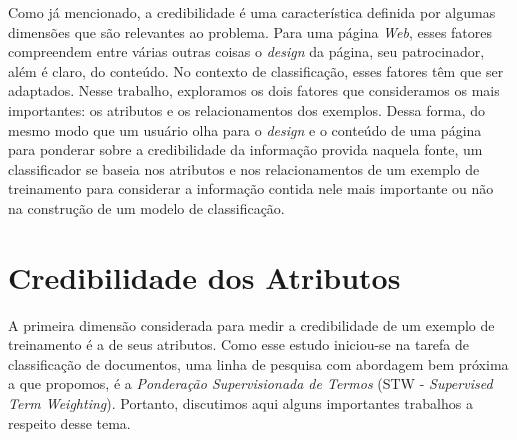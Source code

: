 Como já mencionado, a credibilidade é uma característica definida por algumas dimensões que são relevantes ao problema. Para uma página \textit{Web}, esses fatores compreendem entre várias outras coisas o \textit{design} da página, seu patrocinador, além é claro, do conteúdo. No contexto de classificação, esses fatores têm que ser adaptados. Nesse trabalho, exploramos os dois fatores que consideramos os mais importantes: os atributos e os relacionamentos dos exemplos. Dessa forma, do mesmo modo que um usuário olha para o \textit{design} e o conteúdo de uma página para ponderar sobre a credibilidade da informação provida naquela fonte, um classificador se baseia nos atributos e nos relacionamentos de um exemplo de treinamento para considerar a informação contida nele mais importante ou não na construção de um modelo de classificação.



\section{Credibilidade dos Atributos}
\label{sec::supervised}

A primeira dimensão considerada para medir a credibilidade de um exemplo de treinamento é a de seus atributos. Como esse estudo iniciou-se na tarefa de classificação de documentos, uma linha de pesquisa com abordagem bem próxima a que propomos, é a \textit{Ponderação Supervisionada de Termos} (\textsc{STW} - \textit{Supervised Term Weighting}). Portanto, discutimos aqui alguns importantes trabalhos a respeito desse tema.

